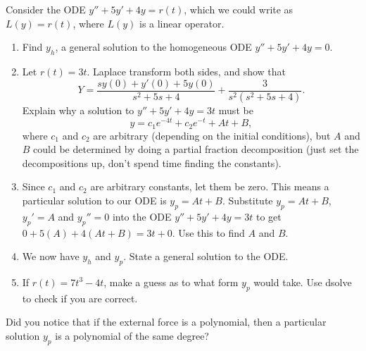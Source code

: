 \begin{problem}
Consider the ODE $y''+5y'+4y=r(t)$, which we could write as $L(y)=r(t)$, where $L(y)$ is a linear operator. 
\begin{enumerate}
 \item Find $y_h$, a general solution to the homogeneous ODE $y''+5y'+4y=0$.
 \item Let $r(t)=3t$.  Laplace transform both sides, and show that 
$$
Y=
\dfrac{sy(0)+y'(0)+5y(0)}{s^2+5s+4}
+\dfrac{3}{s^2(s^2+5s+4)}
.$$ Explain why a solution to $y''+5y'+4y=3t$ must be $$y=c_1 e^{-4t}+c_2e^{-t}+At+B,$$ where $c_1$ and $c_2$ are arbitrary (depending on the initial conditions), but $A$ and $B$ could be determined by doing a partial fraction decomposition (just set the decompositions up, don't spend time finding the constants).
 \item Since $c_1$ and $c_2$ are arbitrary constants, let them be zero. This means a particular solution to our ODE is $y_p=At+B$.  Substitute $y_p=At+B$, $y_p'=A$ and $y_p''=0$ into the ODE $y''+5y'+4y=3t$ to get $0+5(A)+4(At+B)=3t+0$.  Use this to find $A$ and $B$.
 \item We now have $y_h$ and $y_p$. State a general solution to the ODE.
 \item If $r(t) = 7t^3-4t$, make a guess as to what form $y_p$ would take. 
Use dsolve to check if you are correct. 
\end{enumerate}

Did you notice that if the external force is a polynomial, then a particular solution $y_p$ is a polynomial of the same degree?

\end{problem}
